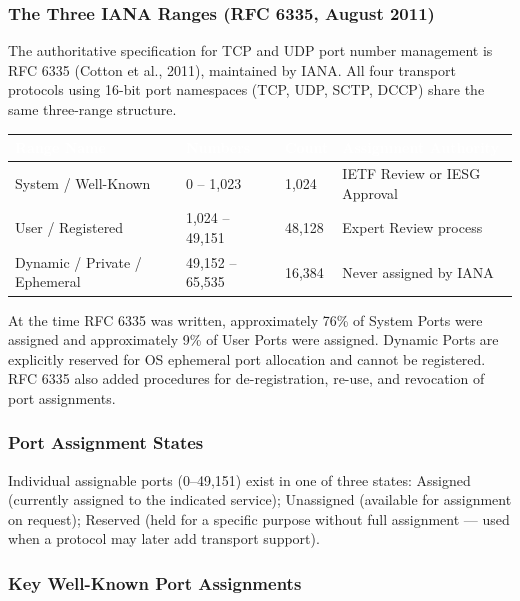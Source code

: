 \documentclass[11pt,letterpaper]{article}
\newcommand{\tableheader}[1]{\textbf{\sffamily\textcolor{white}{#1}}}
\begin{document}
\subsubsection{The Three IANA Ranges (RFC 6335, August 2011)}

The authoritative specification for TCP and UDP port number management is RFC 6335 (Cotton et al., 2011), maintained by IANA. All four transport protocols using 16-bit port namespaces (TCP, UDP, SCTP, DCCP) share the same three-range structure.

\begin{center}
\begin{tabularx}{\textwidth}{L{3cm}L{2.5cm}L{2cm}X}
\toprule
{}
\tableheader{Range Name} & \tableheader{Numbers} & \tableheader{Count} & \tableheader{Assignment Authority} \\
\midrule
System / Well-Known & 0 -- 1,023 & 1,024 & IETF Review or IESG Approval \\
User / Registered & 1,024 -- 49,151 & 48,128 & Expert Review process \\
Dynamic / Private / Ephemeral & 49,152 -- 65,535 & 16,384 & Never assigned by IANA \\
\bottomrule
\end{tabularx}
\end{center}

At the time RFC 6335 was written, approximately 76\% of System Ports were assigned and approximately 9\% of User Ports were assigned. Dynamic Ports are explicitly reserved for OS ephemeral port allocation and cannot be registered. RFC 6335 also added procedures for de-registration, re-use, and revocation of port assignments.

\subsubsection{Port Assignment States}

Individual assignable ports (0--49,151) exist in one of three states: Assigned (currently assigned to the indicated service); Unassigned (available for assignment on request); Reserved (held for a specific purpose without full assignment --- used when a protocol may later add transport support).

\subsubsection{Key Well-Known Port Assignments}
\end{document}
